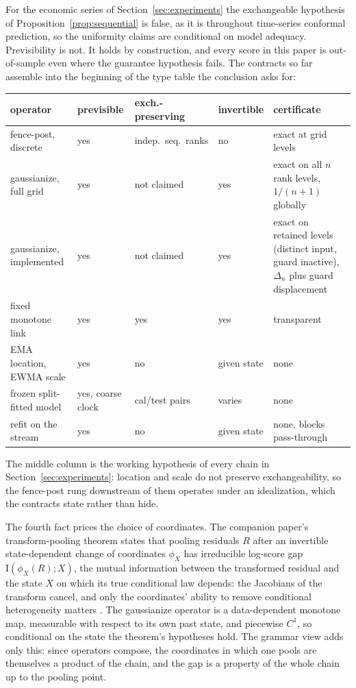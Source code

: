 \documentclass[11pt]{article}
\theoremstyle{remark}
\newcommand{\I}{\mathrm{I}}
\begin{document}
For the economic series of Section~\ref{sec:experiments} the exchangeable hypothesis of
Proposition~\ref{prop:sequential} is false, as it is throughout time-series conformal
prediction, so the uniformity claims are conditional on model adequacy. Previsibility is
not. It holds by construction, and every score in this paper is out-of-sample even where
the guarantee hypothesis fails. The contracts so far assemble into the beginning of the
type table the conclusion asks for:

\begin{center}
\footnotesize
\setlength{\tabcolsep}{4pt}
\begin{tabular}{lllp{5.2em}>{\raggedright\arraybackslash}p{11em}}
\toprule
operator & previsible & exch.-preserving & invertible & certificate \\
\midrule
fence-post, discrete & yes & indep.\ seq.\ ranks & no &
  exact at grid levels \\
gaussianize, full grid & yes & not claimed & yes &
  exact on all $n$ rank levels, $1/(n{+}1)$ globally \\
gaussianize, implemented & yes & not claimed & yes &
  exact on retained levels (distinct input, guard inactive), $\Delta_n$ plus guard
  displacement \\
fixed monotone link & yes & yes & yes & transparent \\
EMA location, EWMA scale & yes & no & given state & none \\
frozen split-fitted model & yes, coarse clock & cal/test pairs & varies & none \\
refit on the stream & yes & no & given state & none, blocks pass-through \\
\bottomrule
\end{tabular}
\end{center}

The middle column is the working hypothesis of every chain in
Section~\ref{sec:experiments}: location and scale do not preserve exchangeability, so the
fence-post rung downstream of them operates under an idealization, which the contracts
state rather than hide.

The fourth fact prices the choice of coordinates. The companion paper's transform-pooling
theorem states that pooling residuals $R$ after an invertible state-dependent change of
coordinates $\phi_X$ has irreducible log-score gap $\I(\phi_X(R); X)$, the mutual
information between the transformed residual and the state $X$ on which its true
conditional law depends: the Jacobians of the
transform cancel, and only the coordinates' ability to remove conditional heterogeneity
matters \citep{cotton2026gap}. The gaussianize operator is a data-dependent monotone map,
measurable with respect to its own past state, and piecewise $C^1$, so conditional on the
state the theorem's hypotheses hold. The grammar view adds only this: since operators
compose, the coordinates in which one pools are themselves a product of the chain, and the
gap is a property of the whole chain up to the pooling point.
\end{document}
